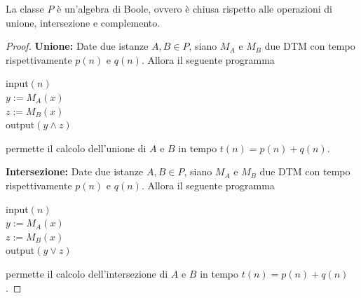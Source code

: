 \begin{theor}
	La classe $P$ è un'algebra di Boole, ovvero è chiusa rispetto alle operazioni di unione, intersezione e complemento.
\end{theor}
\begin{proof}
	\textbf{Unione:} Date due istanze $A,B \in P$, siano $M_A$ e $M_B$ due DTM con tempo rispettivamente $p(n)$ e $q(n)$. Allora il seguente programma
	\begin{center}
		\begin{minipage}{.33\textwidth}
			\begin{tcolorbox}[
				colback=white,
				sharp corners,
				boxrule=.3mm,
				left=20pt,
				top=0pt,
				bottom=0pt,
				colbacktitle=white,
				coltitle=black
				]
				\begin{algorithm}[H]
					\SetAlgoNoEnd
					input$(n)$\\
					$y := M_A (x)$\\
					$z := M_B (x)$ \\
					output$(y \wedge z)$
				\end{algorithm}
			\end{tcolorbox}
		\end{minipage}
	\end{center}
	permette il calcolo dell'unione di $A$ e $B$ in tempo $t(n) = p(n) + q(n)$.
	
	\textbf{Intersezione:} Date due istanze $A,B \in P$, siano $M_A$ e $M_B$ due DTM con tempo rispettivamente $p(n)$ e $q(n)$. Allora il seguente programma
	\begin{center}
		\begin{minipage}{.33\textwidth}
			\begin{tcolorbox}[
				colback=white,
				sharp corners,
				boxrule=.3mm,
				left=20pt,
				top=0pt,
				bottom=0pt,
				colbacktitle=white,
				coltitle=black
				]
				\begin{algorithm}[H]
					\SetAlgoNoEnd
					input$(n)$\\
					$y := M_A (x)$\\
					$z := M_B (x)$ \\
					output$(y \vee z)$
				\end{algorithm}
			\end{tcolorbox}
		\end{minipage}
	\end{center}
	permette il calcolo dell'intersezione di $A$ e $B$ in tempo $t(n) = p(n) + q(n)$.
	

\end{proof}
